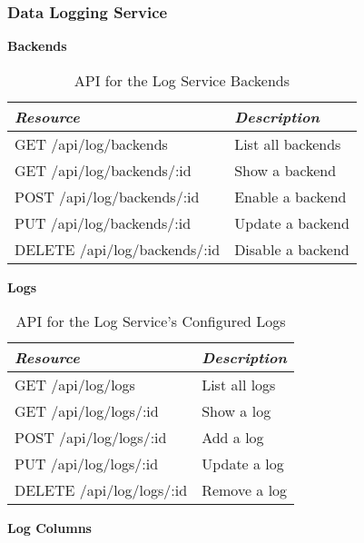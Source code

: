    \subsubsection{Data Logging Service}\label{sec:rest-log}

      \large{\textbf{Backends}}

      \begin{table}[H]
        \centering
        \begin{tabular}{p{8cm} p{10cm}}
          \toprule
          \emph{Resource} & \emph{Description} \\ [0.5ex]
          \midrule
          GET /api/log/backends & List all backends \\
          GET /api/log/backends/:id & Show a backend \\
          POST /api/log/backends/:id & Enable a backend \\
          PUT /api/log/backends/:id & Update a backend \\
          DELETE /api/log/backends/:id & Disable a backend \\
          \bottomrule
        \end{tabular}
        \caption{API for the Log Service Backends}\label{tab:rest-log-backend}
      \end{table}

      \large{\textbf{Logs}}

      \begin{table}[H]
        \centering
        \begin{tabular}{p{8cm} p{10cm}}
          \toprule
          \emph{Resource} & \emph{Description} \\ [0.5ex]
          \midrule
          GET /api/log/logs & List all logs \\
          GET /api/log/logs/:id & Show a log \\
          POST /api/log/logs/:id & Add a log \\
          PUT /api/log/logs/:id & Update a log \\
          DELETE /api/log/logs/:id & Remove a log \\
          \bottomrule
        \end{tabular}
        \caption{API for the Log Service's Configured Logs}\label{tab:rest-log-logs}
      \end{table}

      \large{\textbf{Log Columns}}

